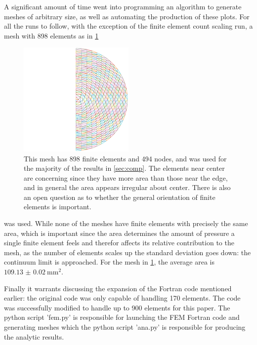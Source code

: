 \documentclass[12pt,times,twocolumn,3p]{elsarticle}
\begin{document}
A significant amount of time went into programming an algorithm to generate meshes
of arbitrary size, as well as automating the production of these plots. For all
the runs to follow, with the exception of the finite element count scaling run,
a mesh with 898 elements as in \cref{fig:meshm}
\begin{figure}[h]
    \centering
    \includegraphics[width=0.5\textwidth]{./mesh_max.pdf}
    \caption{This mesh has 898 finite elements and 494 nodes, and was used for
    the majority of the results in \cref{sec:comp}. The elements near
    center are concerning since they have more area than those near the edge, and
    in general the area appears irregular about center. There is also an open question
    as to whether the general orientation of finite elements is important.}
    \label{fig:meshm}
\end{figure}
was used. While none of the meshes have finite elements with precisely the same
area, which is important since the area determines the amount of pressure a single
finite element feels and therefor affects its relative contribution to the mesh, as
the number of elements scales up the standard deviation goes down: the continuum
limit is approached. For the mesh in \cref{fig:meshm}, the average area is $\SI{109.13(2)}{\milli\meter^2}$.

Finally it warrants discussing the expansion of the Fortran code mentioned earlier:
the original code was only capable of handling 170 elements. The code was successfully
modified to handle up to 900 elements for this paper. The python script 'fem.py'
is responsible for launching the FEM Fortran code and generating meshes which the
python script 'ana.py' is responsible for producing the analytic results.
\end{document}
